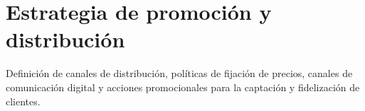 \section{Estrategia de promoción y distribución}
\label{sec:estrategia_promocion}

Definición de canales de distribución, políticas de fijación de precios, canales de comunicación digital y acciones promocionales para la captación y fidelización de clientes.
